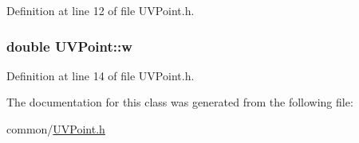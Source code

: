 Definition at line 12 of file UVPoint.h.

\hypertarget{classUVPoint_a35c7463cf7ad4605f19808f3110f41e8}{
\subsubsection[{w}]{\setlength{\rightskip}{0pt plus 5cm}double {\bf UVPoint::w}}}
\label{classUVPoint_a35c7463cf7ad4605f19808f3110f41e8}


Definition at line 14 of file UVPoint.h.



The documentation for this class was generated from the following file:\begin{DoxyCompactItemize}
\item 
common/\hyperlink{UVPoint_8h}{UVPoint.h}\end{DoxyCompactItemize}
